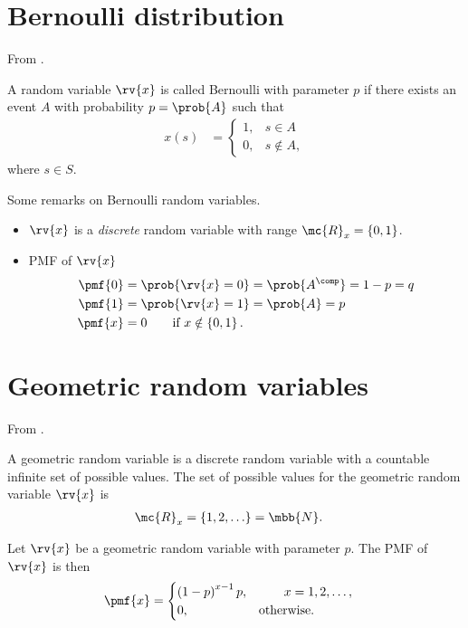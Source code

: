 \section{Bernoulli distribution}
From \cite{psaromiligkos_slides_2019}.
\begin{mydefinition}
    A random variable $\rv{x}$ is called Bernoulli with parameter $p$ if there exists an event $A$ with probability $p = \prob{A}$ such that
    \begin{align}
        x(s) &=
        \begin{cases}
            1, & s\in A\\
            0, & s\notin A,
        \end{cases}
    \end{align}
    where $s\in S$.
\end{mydefinition}
\begin{myremark}
    Some remarks on Bernoulli random variables.
    \begin{itemize}
        \item $\rv{x}$ is a \emph{discrete} random variable with range $\mc{R}_{x} = \left\{ 0, 1\right\}$.
        \item PMF of $\rv{x}$ 
        \begin{align}
            \pmf{0} &= \prob{\rv{x} = 0} = \prob{A^{\comp}} = 1 - p = q\\
            \pmf{1} &= \prob{\rv{x} = 1} = \prob{A} = p\\
            \pmf{x} &= 0 \qquad \text{if } x\notin \left\{ 0,1\right\}.
        \end{align}
    \end{itemize}
\end{myremark}

\section{Geometric random variables}
From \cite{psaromiligkos_slides_2019}.
\begin{mydefinition}
    A geometric random variable is a discrete random variable with a countable infinite set of possible values. The set of possible values for the geometric random variable $\rv{x}$ is
    \begin{align}
        \mc{R}_{x} &= \left\{ 1, 2, \ldots\right\} = \mbb{N}.
    \end{align}
\end{mydefinition}
\begin{mytheorem}
    Let $\rv{x}$ be a geometric random variable with parameter $p$. The PMF of $\rv{x}$ is then
    \begin{align}
        \pmf{x} &= 
        \begin{cases}
            \left( 1 - p \right)^{x-1}p, &\qquad x = 1, 2, \ldots,\\
            0, & \text{otherwise}.
        \end{cases}
    \end{align}
\end{mytheorem}

